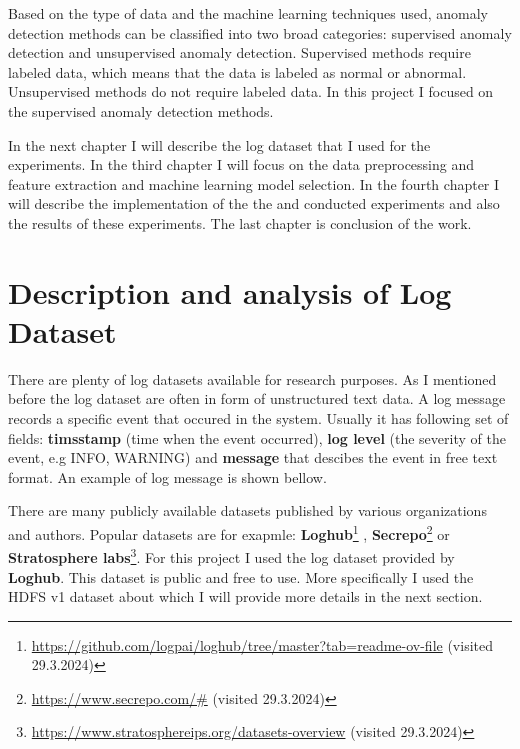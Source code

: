 Based on the type of data and the machine learning techniques used, anomaly detection methods can be classified into two broad categories: supervised anomaly detection and unsupervised
anomaly detection. Supervised methods require labeled data, which means that the data is labeled as normal or abnormal. Unsupervised methods do not require labeled data. In this project I focused on 
the supervised anomaly detection methods.

In the next chapter I will describe the log dataset that I used for the experiments. In the third chapter I will focus on the data preprocessing and feature extraction and machine learning model selection.
In the fourth chapter I will describe the implementation of the the and conducted experiments and also the results of these experiments. The last chapter is conclusion of the work.

\chapter{Description and analysis of Log Dataset}

There are plenty of log datasets available for research purposes. As I mentioned before the log dataset are often in form of unstructured text data.
A log message records a specific event that occured in the system. Usually it has following set of fields: \textbf{timsstamp} (time when the event occurred), \textbf{log level} (the severity
of the event, e.g INFO, WARNING) and \textbf{message} that descibes the event in free text format. An example of log message is shown bellow.

\begin{center}


\end{center}

There are many publicly available datasets published by various organizations and authors. Popular datasets are for exapmle: \textbf{Loghub}\footnote{\url{https://github.com/logpai/loghub/tree/master?tab=readme-ov-file} (visited 29.3.2024)} , %
\textbf{Secrepo}\footnote{\url{https://www.secrepo.com/#} (visited 29.3.2024)} or \textbf{Stratosphere labs}\footnote{\url{https://www.stratosphereips.org/datasets-overview} (visited 29.3.2024)}. For this project I used the log dataset provided by \textbf{Loghub}. This dataset is public and free to use. 
More specifically I used the HDFS v1 dataset about which I will provide more details in the next section.

